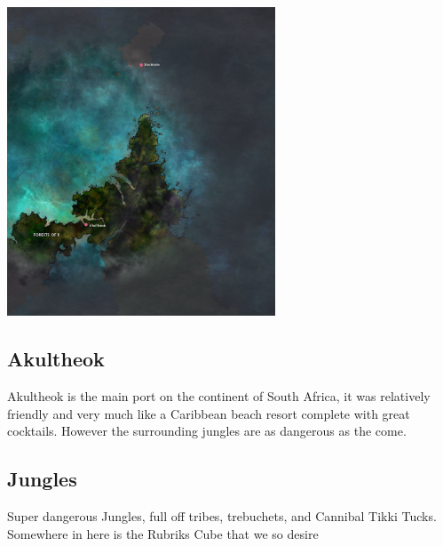 \vspace{5mm}

\begin{center}
\includegraphics[width=80mm]{./content/img/southAfrica.png}
\begin{figure}[h]
\end{figure}
\end{center}

\noindent 

\subsection*{Akultheok} 

Akultheok is the main port on the continent of South Africa, it was relatively friendly and very much like a Caribbean beach resort complete with great cocktails. However the surrounding jungles are as dangerous as the come. 

\smallskip

\subsection*{Jungles} 

Super dangerous Jungles, full off tribes, trebuchets, and Cannibal Tikki Tucks. Somewhere in here is the Rubriks Cube that we so desire

\smallskip


\bigskip


\clearpage
